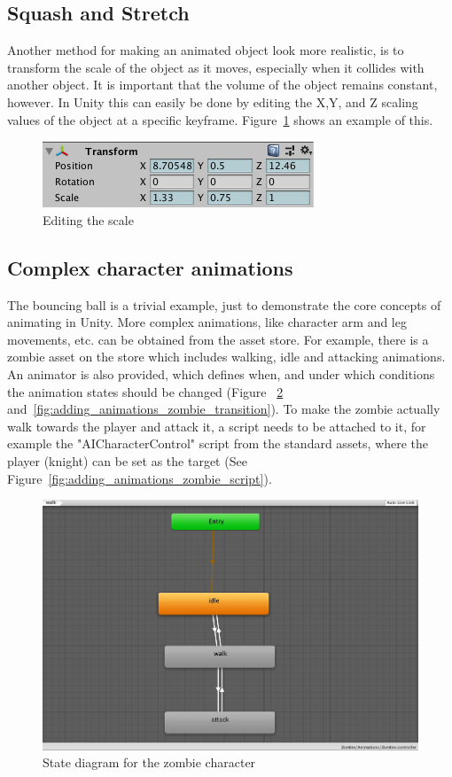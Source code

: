 \documentclass[12pt, a4paper, titlepage]{article}
\begin{document}
\subsection{Squash and Stretch}

Another method for making an animated object look more realistic, is to transform the scale of the object as it moves, especially when it collides with another object. It is important that the volume of the object remains constant, however. In Unity this can easily be done by editing the X,Y, and Z scaling values of the object at a specific keyframe. Figure~\ref{fig:adding_animations_scaling} shows an example of this.

\begin{figure}[htbp]
  \centering
  \includegraphics[width=.4\textwidth]{pictures/animation_scale}
  \caption{Editing the scale}
  \label{fig:adding_animations_scaling}
\end{figure}

\subsection{Complex character animations}

The bouncing ball is a trivial example, just to demonstrate the core concepts of animating in Unity. More complex animations, like character arm and leg movements, etc. can be obtained from the asset store. For example, there is a zombie asset on the store which includes walking, idle and attacking animations. An animator is also provided, which defines when, and under which conditions the animation states should be changed (Figure ~\ref{fig:adding_animations_zombie_states} and~\ref{fig:adding_animations_zombie_transition}).  To make the zombie actually walk towards the player and attack it, a script needs to be attached to it, for example the "AICharacterControl" script from the standard assets, where the player (knight) can be set as the target (See Figure~\ref{fig:adding_animations_zombie_script}).

\begin{figure}[htbp]
  \centering
  \includegraphics[width=.4\textwidth]{pictures/zombie_states}
  \caption{State diagram for the zombie character}
  \label{fig:adding_animations_zombie_states}
\end{figure}
\end{document}
